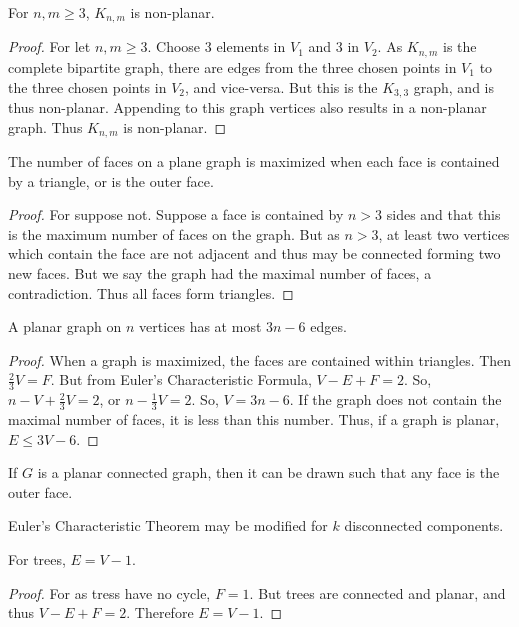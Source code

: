 \documentclass[crop=false,class=book,oneside]{standalone}
\begin{document}
\begin{theorem}
For $n,m\geq 3$, $K_{n,m}$ is non-planar.
\end{theorem}
\begin{proof}
For let $n,m\geq 3$. Choose $3$ elements in $V_1$ and $3$ in $V_2$. As $K_{n,m}$ is the complete bipartite graph, there are edges from the three chosen points in $V_1$ to the three chosen points in $V_2$, and vice-versa. But this is the $K_{3,3}$ graph, and is thus non-planar. Appending to this graph vertices also results in a non-planar graph. Thus $K_{n,m}$ is non-planar.
\end{proof}
\begin{lemma}
The number of faces on a plane graph is maximized when each face is contained by a triangle, or is the outer face.
\end{lemma}
\begin{proof}
For suppose not. Suppose a face is contained by $n>3$ sides and that this is the maximum number of faces on the graph. But as $n>3$, at least two vertices which contain the face are not adjacent and thus may be connected forming two new faces. But we say the graph had the maximal number of faces, a contradiction. Thus all faces form triangles.
\end{proof}
\begin{theorem}
A planar graph on $n$ vertices has at most $3n-6$ edges.
\end{theorem}
\begin{proof}
When a graph is maximized, the faces are contained within triangles. Then $\frac{2}{3}V= F$. But from Euler's Characteristic Formula, $V-E+F=2$. So, $n-V+\frac{2}{3}V = 2$, or $n-\frac{1}{3}V = 2$. So, $V=3n-6$. If the graph does not contain the maximal number of faces, it is less than this number. Thus, if a graph is planar, $E\leq 3V-6$.
\end{proof}
\begin{theorem}
If $G$ is a planar connected graph, then it can be drawn such that any face is the outer face.
\end{theorem}
\begin{theorem}
Euler's Characteristic Theorem may be modified for $k$ disconnected components.
\end{theorem}
\begin{corollary}
For trees, $E=V-1$.
\end{corollary}
\begin{proof}
For as tress have no cycle, $F=1$. But trees are connected and planar, and thus $V-E+F = 2$. Therefore $E=V-1$.
\end{proof}
\end{document}
